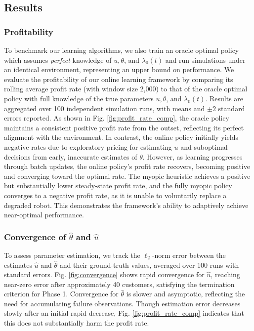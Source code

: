\documentclass[letterpaper, 10 pt, conference]{IEEEconf}
\begin{document}
\subsection{Results}
\subsubsection{Profitability}
To benchmark our learning algorithms, we also train an oracle optimal policy which assumes \emph{perfect} knowledge of $u, \theta$, and $\lambda_0(t)$ and run simulations under an identical environment, representing an upper bound on performance. We evaluate the profitability of our online learning framework by comparing its rolling average profit rate (with window size 2,000) to that of the oracle optimal policy with full knowledge of the true parameters $u, \theta$, and $\lambda_0(t)$. Results are aggregated over 100 independent simulation runs, with means and $\pm2$ standard errors reported. As shown in Fig. \ref{fig:profit_rate_comp}, the oracle policy maintains a consistent positive profit rate from the outset, reflecting its perfect alignment with the environment. In contrast, the online policy initially yields negative rates due to exploratory pricing for estimating $u$ and suboptimal decisions from early, inaccurate estimates of $\theta$. However, as learning progresses through batch updates, the online policy's profit rate recovers, becoming positive and converging toward the optimal rate. The myopic heuristic achieves a positive but substantially lower steady-state profit rate, and the fully myopic policy converges to a negative profit rate, as it is unable to voluntarily replace a degraded robot. This demonstrates the framework's ability to adaptively achieve near-optimal performance.%

\subsubsection{Convergence of $\widehat\theta$ and $\widehat u$}
To assess parameter estimation, we track the $\ell_2$-norm error between the estimates $\widehat{u}$ and $\widehat{\theta}$ and their ground-truth values, averaged over 100 runs with standard errors. Fig. \ref{fig:convergence} shows rapid convergence for $\widehat{u}$, reaching near-zero error after approximately 40 customers, satisfying the termination criterion for Phase 1. Convergence for $\widehat{\theta}$ is slower and asymptotic, reflecting the need for accumulating failure observations. Though estimation error decreases slowly after an initial rapid decrease, Fig. \ref{fig:profit_rate_comp} indicates that this does not substantially harm the profit rate.
\end{document}
